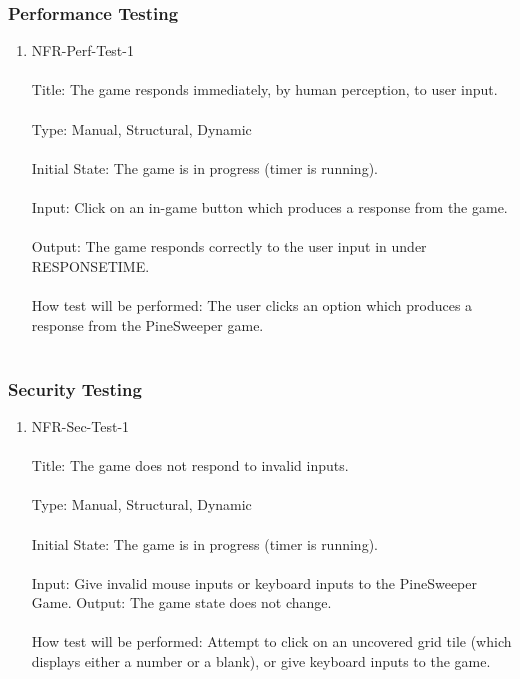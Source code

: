 \documentclass[12pt, titlepage]{article}
\begin{document}
\subsubsection{Performance Testing}
\begin{enumerate}
\item{NFR-Perf-Test-1\\\\}
Title: The game responds immediately, by human perception, to user input.\\\\
Type: Manual, Structural, Dynamic\\\\
Initial State: The game is in progress (timer is running).\\\\
Input: Click on an in-game button which produces a response from the game.\\\\
Output: The game responds correctly to the user input in under RESPONSETIME.\\\\
How test will be performed: The user clicks an option which produces a response from the PineSweeper game.\\\\
\end{enumerate}

\subsubsection{Security Testing}
\begin{enumerate}
\item{NFR-Sec-Test-1\\\\}
Title: The game does not respond to invalid inputs.\\\\
Type: Manual, Structural, Dynamic\\\\
Initial State: The game is in progress (timer is running).\\\\
Input: Give invalid mouse inputs or keyboard inputs to the PineSweeper Game.
Output: The game state does not change.\\\\
How test will be performed: Attempt to click on an uncovered grid tile (which displays either a number or a blank), or give keyboard inputs to the game.\\\\
\end{enumerate}
\end{document}
